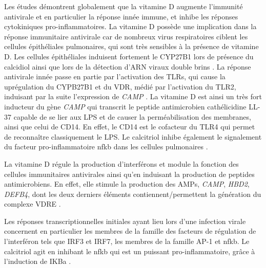 \documentclass[
  a4paper,
  DIV=11,
  numbers=noendperiod,
  listof=totoc]{scrreprt}
\begin{document}
Les études démontrent globalement que la vitamine D augmente l'immunité
antivirale et en particulier la réponse innée immune, et inhibe les
réponses cytokiniques pro-inflammatoires. La vitamine D possède une
implication dans la réponse immunitaire antivirale car de nombreux virus
respiratoires ciblent les cellules épithéliales pulmonaires, qui sont
très sensibles à la présence de vitamine D. Les cellules épithéliales
induisent fortement le \ac{CYP27B1} lors de présence du calcidiol ainsi
que lors de la détection d'ARN viraux double brins
\autocite{Bishop.2021}. La réponse antivirale innée passe en partie par
l'activation des \acp{TLR}, qui cause la uprégulation du CYPB27B1 et du
VDR, médié par l'activation du TLR2, induisant par la suite l'expression
de \emph{CAMP} \autocite{Liu.2006}. La vitamine D est ainsi un très fort
inducteur du gène \emph{CAMP} qui transcrit le peptide antimicrobien
cathélicidine LL-37 capable de se lier aux \ac{LPS} et de causer la
perméabilisation des membranes, ainsi que celui de CD14. En effet, le
CD14 est le cofacteur du TLR4 qui permet de reconnaître classiquement le
LPS. Le calcitriol inhibe également le signalement du facteur
pro-inflammatoire \ac{nfkb} dans les cellules pulmonaires
\autocite{Bishop.2021}.

La vitamine D régule la production d'interférons et module la fonction
des cellules immunitaires antivirales ainsi qu'en induisant la
production de peptides antimicrobiens. En effet, elle stimule la
production des AMPs, \emph{CAMP}, \emph{HBD2}, \emph{DEFB4}, dont les
deux derniers éléments contiennent/permettent la génération du complexe
\ac{VDRE} \autocite{Bishop.2021}.

Les réponses transcriptionnelles initiales ayant lieu lors d'une
infection virale concernent en particulier les membres de la famille des
facteurs de régulation de l'interféron tels que IRF3 et IRF7, les
membres de la famille AP-1 et \ac{nfkb}. Le calcitriol agit en inhibant
le \ac{nfkb} qui est un puissant pro-inflammatoire, grâce à l'induction
de \ac{IKBa} \autocite{Bishop.2021}.
\end{document}
